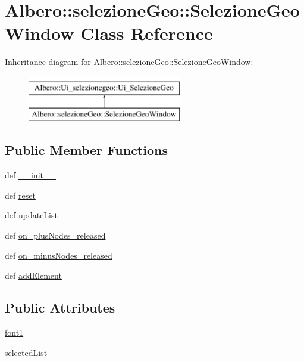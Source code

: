 \hypertarget{classAlbero_1_1selezioneGeo_1_1SelezioneGeoWindow}{
\section{Albero::selezioneGeo::SelezioneGeoWindow Class Reference}
\label{classAlbero_1_1selezioneGeo_1_1SelezioneGeoWindow}
}
Inheritance diagram for Albero::selezioneGeo::SelezioneGeoWindow:\begin{figure}[H]
\begin{center}
\leavevmode
\includegraphics[height=2.000000cm]{classAlbero_1_1selezioneGeo_1_1SelezioneGeoWindow}
\end{center}
\end{figure}
\subsection*{Public Member Functions}
\begin{DoxyCompactItemize}
\item 
def \hyperlink{classAlbero_1_1selezioneGeo_1_1SelezioneGeoWindow_a87f0ce61041f73b9adbd9af0f11d046b}{\_\-\_\-init\_\-\_\-}
\item 
def \hyperlink{classAlbero_1_1selezioneGeo_1_1SelezioneGeoWindow_aaf7de07c0412a7b2c8a3912546415092}{reset}
\item 
def \hyperlink{classAlbero_1_1selezioneGeo_1_1SelezioneGeoWindow_af9164f9cb57f9ce1bbea2c0c7bc9a62a}{updateList}
\item 
def \hyperlink{classAlbero_1_1selezioneGeo_1_1SelezioneGeoWindow_a44be6abbdd9335f881aed490a1158e86}{on\_\-plusNodes\_\-released}
\item 
def \hyperlink{classAlbero_1_1selezioneGeo_1_1SelezioneGeoWindow_a179d8543c390475fd52036eed3c8c4f6}{on\_\-minusNodes\_\-released}
\item 
def \hyperlink{classAlbero_1_1selezioneGeo_1_1SelezioneGeoWindow_a2cec0e74e6ef06e07a81211946c95696}{addElement}
\end{DoxyCompactItemize}
\subsection*{Public Attributes}
\begin{DoxyCompactItemize}
\item 
\hyperlink{classAlbero_1_1selezioneGeo_1_1SelezioneGeoWindow_a4a5cd59b41490e57507dac78c65e460b}{font1}
\item 
\hyperlink{classAlbero_1_1selezioneGeo_1_1SelezioneGeoWindow_afb237ebd9c307b1fb96bb2adabdc374e}{selectedList}
\end{DoxyCompactItemize}


